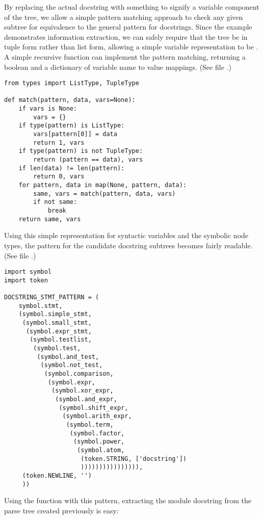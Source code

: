 By replacing the actual docstring with something to signify a variable
component of the tree, we allow a simple pattern matching approach to
check any given subtree for equivalence to the general pattern for
docstrings.  Since the example demonstrates information extraction, we
can safely require that the tree be in tuple form rather than list
form, allowing a simple variable representation to be
.  A simple recursive function can implement
the pattern matching, returning a boolean and a dictionary of variable
name to value mappings.  (See file .)

\begin{verbatim}
from types import ListType, TupleType

def match(pattern, data, vars=None):
    if vars is None:
        vars = {}
    if type(pattern) is ListType:
        vars[pattern[0]] = data
        return 1, vars
    if type(pattern) is not TupleType:
        return (pattern == data), vars
    if len(data) != len(pattern):
        return 0, vars
    for pattern, data in map(None, pattern, data):
        same, vars = match(pattern, data, vars)
        if not same:
            break
    return same, vars
\end{verbatim}

Using this simple representation for syntactic variables and the symbolic
node types, the pattern for the candidate docstring subtrees becomes
fairly readable.  (See file .)

\begin{verbatim}
import symbol
import token

DOCSTRING_STMT_PATTERN = (
    symbol.stmt,
    (symbol.simple_stmt,
     (symbol.small_stmt,
      (symbol.expr_stmt,
       (symbol.testlist,
        (symbol.test,
         (symbol.and_test,
          (symbol.not_test,
           (symbol.comparison,
            (symbol.expr,
             (symbol.xor_expr,
              (symbol.and_expr,
               (symbol.shift_expr,
                (symbol.arith_expr,
                 (symbol.term,
                  (symbol.factor,
                   (symbol.power,
                    (symbol.atom,
                     (token.STRING, ['docstring'])
                     )))))))))))))))),
     (token.NEWLINE, '')
     ))
\end{verbatim}

Using the  function with this pattern, extracting the
module docstring from the parse tree created previously is easy:

